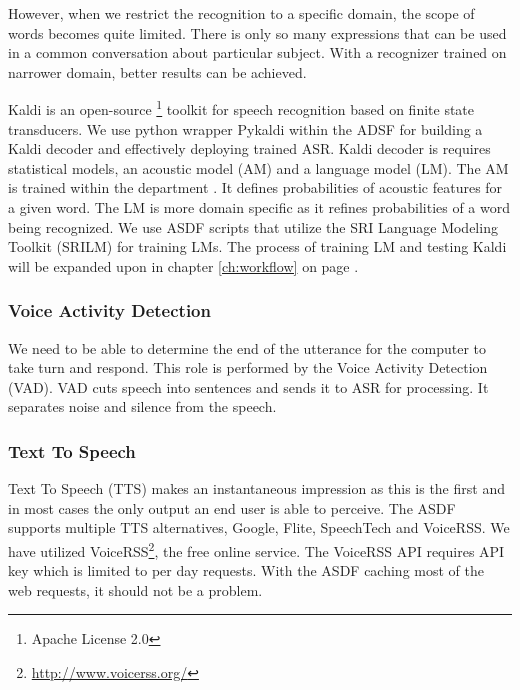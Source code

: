 However, when we restrict the recognition to a specific domain, the scope of words becomes quite limited.
There is only so many expressions that can be used in a common conversation about particular subject.
With a recognizer trained on narrower domain, better results can be achieved.


Kaldi is an open-source \footnote{Apache License 2.0} toolkit for speech recognition based on finite state transducers.
We use python wrapper Pykaldi within the ADSF for building a Kaldi decoder and effectively deploying trained ASR.
Kaldi decoder is requires statistical models, an acoustic model (AM) and a language model (LM).
The AM is trained within the department \cite{oplatek}.
It defines probabilities of acoustic features for a given word.
The LM is more domain specific as it refines probabilities of a word being recognized.
We use ASDF scripts that utilize the SRI Language Modeling Toolkit (SRILM) for training LMs.
The process of training LM and testing Kaldi will be expanded upon in chapter \ref{ch:workflow} on page \pageref{ch:workflow}.

\subsubsection{Voice Activity Detection}

We need to be able to determine the end of the utterance for the computer to take turn and respond.
This role is performed by the Voice Activity Detection (VAD).
VAD cuts speech into sentences and sends it to ASR for processing.
It separates noise and silence from the speech.

\subsubsection{Text To Speech}

Text To Speech (TTS) makes an instantaneous impression as this is the first and in most cases the only output an end user is able to perceive. %
The ASDF supports multiple TTS alternatives, Google, Flite, SpeechTech and VoiceRSS.
We have utilized VoiceRSS\footnote{\url{http://www.voicerss.org/}}, the free online service.
The VoiceRSS API requires API key which is limited to per day requests.
With the ASDF caching most of the web requests, it should not be a problem.

